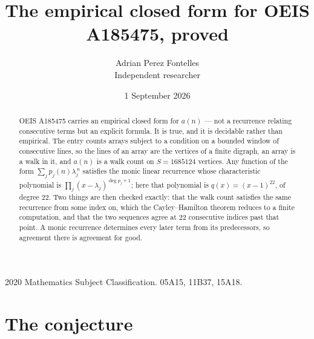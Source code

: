 \documentclass[11pt,a4paper]{article}
\title{The empirical closed form for OEIS A185475, proved}
\author{Adrian Perez Fontelles\\ \small Independent researcher}
\date{1 September 2026}
\theoremstyle{plain}
\theoremstyle{definition}
\begin{document}
\maketitle

\begin{abstract}
OEIS A185475 carries an empirical closed form for $a(n)$ --- not a recurrence relating
consecutive terms but an explicit formula. It is true, and it is decidable rather than
empirical. The entry counts arrays subject to a condition on a bounded window of consecutive lines, so the lines of an array are the
vertices of a finite digraph, an array is a walk in it, and $a(n)$ is a walk count on
$S=1685124$ vertices. Any function of the form $\sum_j p_j(n)\lambda_j^{\,n}$ satisfies the
monic linear recurrence whose characteristic polynomial is
$\prod_j(x-\lambda_j)^{\deg p_j+1}$; here that polynomial is $q(x)=(x-1)^{22}$, of degree
$22$. Two things are then checked exactly: that the walk count satisfies the same
recurrence from some index on, which the Cayley--Hamilton theorem reduces to a finite
computation, and that the two sequences agree at $22$ consecutive indices past that
point. A monic recurrence determines every later term from its predecessors, so agreement
there is agreement for good.
\end{abstract}

\noindent\small 2020 Mathematics Subject Classification. 05A15, 11B37, 15A18.\normalsize

\section{The conjecture}
\end{document}
